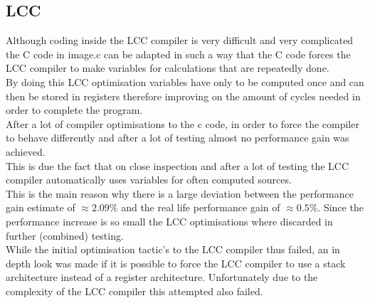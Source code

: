 \documentclass[10pt]{article}
\begin{document}
\subsection{LCC}
Although coding inside the LCC compiler is very difficult and very complicated the C code in image.c can be adapted in such a way that the C code forces the LCC compiler to make variables for calculations that are repeatedly done.\\
By doing this LCC optimisation variables have only to be computed once and can then be stored in registers therefore improving on the amount of cycles needed in order to complete the program.\\
After a lot of compiler optimisations to the c code, in order to force the compiler to behave differently and after a lot of testing almost no performance gain was achieved.\\ 
This is due the fact that on close inspection and after a lot of testing the LCC compiler automatically uses variables for often computed sources.\\
This is the main reason why there is a large deviation between the performance gain estimate of $ \approx 2.09 \%$ and the real life performance gain of $ \approx 0.5 \% $. Since the performance increase is so small the LCC optimisations where discarded in further (combined) testing. \\
While the initial optimisation tactic's to the LCC compiler thus failed, an in depth look was made if it is possible to force the LCC compiler to use a stack architecture instead of a register architecture. Unfortunately due to the complexity of the LCC compiler this attempted also failed. 


\end{document}
